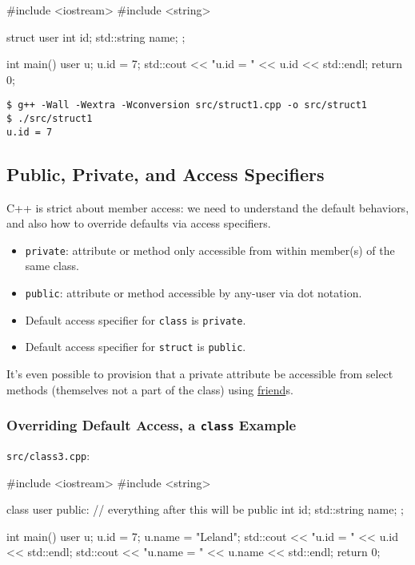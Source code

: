 \documentclass[12pt,letterpaper,twoside]{article}
\begin{document}
\begin{cpp}
#include <iostream>
#include <string>

struct user {
  int id;
  std::string name;
};

int main() {
  user u;
  u.id = 7;
  std::cout << "u.id = " << u.id << std::endl;
  return 0;
}
\end{cpp}

\begin{verbatim}
$ g++ -Wall -Wextra -Wconversion src/struct1.cpp -o src/struct1
$ ./src/struct1 
u.id = 7
\end{verbatim}

\subsection{Public, Private, and Access Specifiers}
C++ is strict about member access: we need to understand
the default behaviors, and also how to override defaults via access specifiers.

\begin{itemize}
\item
  \texttt{private}: attribute or method only accessible from within
  member(s) of the same class.
\item
  \texttt{public}: attribute or method accessible by any-user via dot
  notation.
\item
  Default access specifier for \texttt{class} is \texttt{private}.
\item
  Default access specifier for \texttt{struct} is \texttt{public}.
\end{itemize}

It's even possible to provision that a private attribute be accessible from
select methods (themselves not a part of the class) using \href{https://en.cppreference.com/w/cpp/language/friend}{friend}s.

\subsubsection{Overriding Default Access, a \texttt{class} Example}

\texttt{src/class3.cpp}:
\begin{cpp}
#include <iostream>
#include <string>

class user {
 public: // everything after this will be public
  int id;
  std::string name;
};

int main() {
  user u;
  u.id = 7;
  u.name = "Leland";
  std::cout << "u.id = " << u.id << std::endl;
  std::cout << "u.name = " << u.name << std::endl;
  return 0;
}
\end{cpp}
\end{document}
